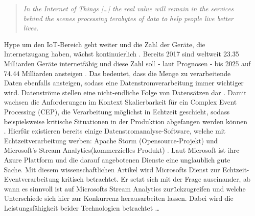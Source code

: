 
\begin{quote} \textit{\glqq In the Internet of Things […] the real value will remain in the services behind the scenes processing terabytes of data to help people live better lives. \grqq~}\cite{Floarea.2014}\\ \end{quote} 

 Hype um den IoT-Bereich geht weiter und die Zahl der Geräte, die Internetzugang haben, wächst kontinuierlich \cite{peter.2015}. Bereits 2017 sind weltweit 23.35 Milliarden Geräte internetfähig und diese Zahl soll - laut Prognosen - bis 2025 auf 74.44 Milliarden ansteigen \cite{Statista.2017}. Das bedeutet, dass die Menge zu verarbeitende Daten ebenfalls ansteigen, sodass eine Datenstromverarbeitung immer wichtiger wird. Datenströme stellen eine nicht-endliche Folge von Datensätzen dar \cite{Mock.2005}. Damit wachsen die Anforderungen im Kontext Skalierbarkeit für ein Complex Event Processing (CEP), die Verarbeitung möglichst in Echtzeit geschieht, sodass beispielsweise kritische Situationen in der Produktion abgefangen werden können \cite{rcrwireless.2016}. Hierfür existieren  bereits einige Datenstromanalyse-Software, welche mit Echtzeitverarbeitung werben: Apache Storm (Opensource-Projekt) \cite{apache.2017} und Microsoft's Stream Analytics(kommerzielles Produkt) \cite{Microsoft.2017}. Laut Microsoft ist ihre Azure Plattform und die darauf angebotenen Dienste eine unglaublich gute Sache. Mit diesem wissenschaftlichen Artikel wird Microsofts Dienst zur Echtzeit-Eventverarbeitung kritisch betrachtet. Er setzt sich mit der Frage auseinander, ab wann es sinnvoll ist auf Microsofts Stream Analytics zurückzugreifen und welche Unterschiede sich hier zur Konkurrenz herausarbeiten lassen. Dabei wird die Leistungsfähigkeit beider Technologien betrachtet …
